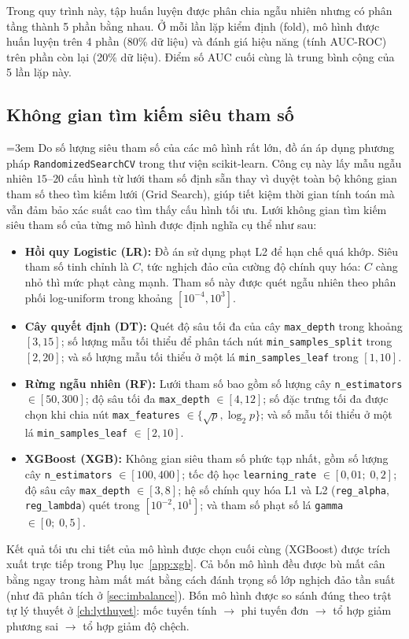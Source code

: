 \documentclass[12pt,a4paper,oneside]{report}
\theoremstyle{vnplain}
\theoremstyle{vndef}
\begin{document}
\noindent Trong quy trình này, tập huấn luyện được phân chia ngẫu nhiên nhưng có phân tầng thành 5 phần bằng nhau. Ở mỗi lần lặp kiểm định (fold), mô hình được huấn luyện trên 4 phần (80\% dữ liệu) và đánh giá hiệu năng (tính AUC-ROC) trên phần còn lại (20\% dữ liệu). Điểm số AUC cuối cùng là trung bình cộng của 5 lần lặp này.

\subsection{Không gian tìm kiếm siêu tham số}
\begingroup
\emergencystretch=3em
Do số lượng siêu tham số của các mô hình rất lớn, đồ án áp dụng phương pháp
\texttt{RandomizedSearchCV} trong thư viện scikit-learn. Công cụ này lấy mẫu ngẫu
nhiên $15$--$20$ cấu hình từ lưới tham số định sẵn thay vì duyệt toàn bộ không gian
tham số theo tìm kiếm lưới (Grid Search), giúp tiết kiệm thời gian tính toán mà vẫn đảm bảo xác suất
cao tìm thấy cấu hình tối ưu. Lưới không gian tìm kiếm siêu tham số của từng mô
hình được định nghĩa cụ thể như sau:
\begin{itemize}
  \item \textbf{Hồi quy Logistic (LR):} Đồ án sử dụng phạt L2 để hạn chế quá
        khớp. Siêu tham số tinh chỉnh là $C$, tức nghịch đảo của cường độ chính quy hóa:
        $C$ càng nhỏ thì mức phạt càng mạnh. Tham số này được quét ngẫu nhiên theo phân
        phối log-uniform trong khoảng $[10^{-4}, 10^{3}]$.
  \item \textbf{Cây quyết định (DT):} Quét độ sâu tối đa của cây
        \texttt{max\_depth} trong khoảng $[3, 15]$; số lượng mẫu tối thiểu để phân
        tách nút \texttt{min\_samples\_split} trong $[2, 20]$; và số lượng mẫu tối
        thiểu ở một lá \texttt{min\_samples\_leaf} trong $[1, 10]$.
  \item \textbf{Rừng ngẫu nhiên (RF):} Lưới tham số bao gồm số lượng cây
        \texttt{n\_estimators} $\in [50, 300]$; độ sâu tối đa
        \texttt{max\_depth} $\in [4, 12]$; số đặc trưng tối đa được chọn khi chia
        nút \texttt{max\_features} $\in \{\sqrt{p}, \log_2 p\}$; và số mẫu tối
        thiểu ở một lá \texttt{min\_samples\_leaf} $\in [2, 10]$.
  \item \textbf{XGBoost (XGB):} Không gian siêu tham số phức tạp nhất, gồm số
        lượng cây \texttt{n\_estimators} $\in [100, 400]$; tốc độ học
        \texttt{learning\_rate} $\in [0{,}01;\; 0{,}2]$; độ sâu cây
        \texttt{max\_depth} $\in [3, 8]$; hệ số chính quy hóa L1 và L2
        (\texttt{reg\_alpha}, \texttt{reg\_lambda}) quét trong
        $[10^{-2}, 10^{1}]$; và tham số phạt số lá \texttt{gamma} $\in [0;\; 0{,}5]$.
\end{itemize}
\endgroup
Kết quả tối ưu chi tiết của mô hình được chọn cuối cùng (XGBoost) được trích xuất trực tiếp trong Phụ lục~\ref{app:xgb}. Cả bốn mô hình đều được bù mất cân bằng
ngay trong hàm mất mát bằng cách đánh trọng số lớp nghịch đảo tần suất (như đã phân tích ở \cref{sec:imbalance}). Bốn mô hình được so sánh đúng theo
trật tự lý thuyết ở \cref{ch:lythuyet}: mốc tuyến tính $\to$ phi tuyến đơn $\to$ tổ hợp
giảm phương sai $\to$ tổ hợp giảm độ chệch.
\end{document}
